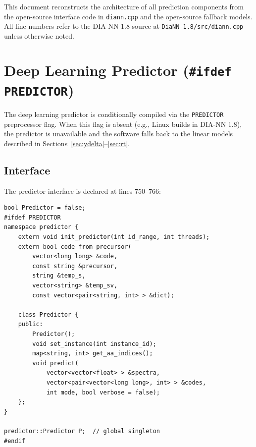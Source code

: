 \documentclass[11pt,a4paper]{article}
\begin{document}
This document reconstructs the architecture of all prediction components from the open-source interface code in \texttt{diann.cpp} and the open-source fallback models. All line numbers refer to the DIA-NN 1.8 source at \texttt{DiaNN-1.8/src/diann.cpp} unless otherwise noted.

\section{Deep Learning Predictor (\texttt{\#ifdef PREDICTOR})}
\label{sec:deep-predictor}

The deep learning predictor is conditionally compiled via the \texttt{PREDICTOR} preprocessor flag. When this flag is absent (e.g., Linux builds in DIA-NN 1.8), the predictor is unavailable and the software falls back to the linear models described in Sections~\ref{sec:ydelta}--\ref{sec:rt}.

\subsection{Interface}

The predictor interface is declared at lines 750--766:

\begin{lstlisting}[caption={Predictor interface declarations (lines 750--766)}]
bool Predictor = false;
#ifdef PREDICTOR
namespace predictor {
    extern void init_predictor(int id_range, int threads);
    extern bool code_from_precursor(
        vector<long long> &code,
        const string &precursor,
        string &temp_s,
        vector<string> &temp_sv,
        const vector<pair<string, int> > &dict);

    class Predictor {
    public:
        Predictor();
        void set_instance(int instance_id);
        map<string, int> get_aa_indices();
        void predict(
            vector<vector<float> > &spectra,
            vector<pair<vector<long long>, int> > &codes,
            int mode, bool verbose = false);
    };
}

predictor::Predictor P;  // global singleton
#endif
\end{lstlisting}
\end{document}
